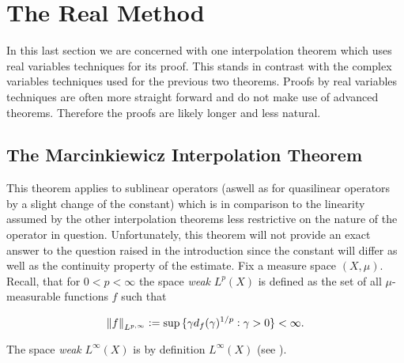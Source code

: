 \section{The Real Method}
In this last section we are concerned with one interpolation theorem which uses real variables techniques for its proof. This stands in contrast with the complex variables techniques used for the previous two theorems. Proofs by real variables techniques are often more straight forward and do not make use of advanced theorems. Therefore the proofs are likely longer and less natural.

\subsection{The Marcinkiewicz Interpolation Theorem}
This theorem applies to sublinear operators (aswell as for quasilinear operators by a slight change of the constant) which is in comparison to the linearity assumed by the other interpolation theorems less restrictive on the nature of the operator in question. Unfortunately, this theorem will not provide an exact answer to the question raised in the introduction since the constant will differ as well as the continuity property of the estimate. Fix a measure space $(X,\mu)$. Recall, that for $0 < p < \infty$ the space \emph{weak} $L^p(X)$ is defined as the set of all $\mu$-measurable functions $f$ such that

\begin{equation*}
	\norm[0]{f}_{L^{p,\infty}} := \sup\cbr[0]{\gamma d_f(\gamma)^{1/p}: \gamma > 0} < \infty.
\end{equation*}

The space \emph{weak} $L^{\infty}(X)$ is by definition $L^{\infty}(X)$ (see \cite[5]{grafakos:fourier:2014}).

\vspace{2mm}

